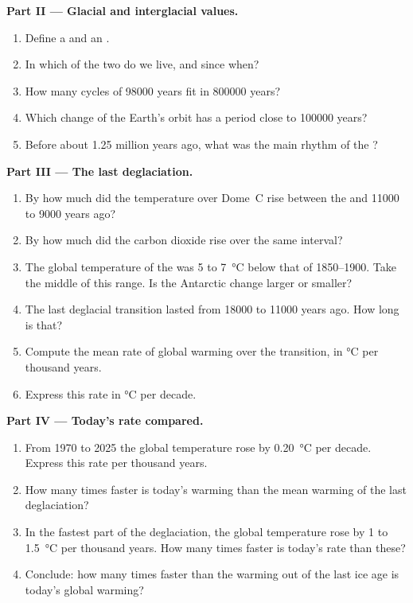 \begin{problem}
\medskip
\noindent\textbf{Part II --- Glacial and interglacial values.}
\begin{enumerate}[resume]
  \item Define a  and an .
  \item In which of the two do we live, and since when?
  \item How many cycles of \num{98000} years fit in \num{800000} years?
  \item Which change of the Earth's orbit has a period close to
        \num{100000} years?
  \item Before about 1.25 million years ago, what was the main rhythm of
        the ?
\end{enumerate}

\medskip
\noindent\textbf{Part III --- The last deglaciation.}
\begin{enumerate}[resume]
  \item By how much did the temperature over Dome~C rise between the  and \num{11000} to \num{9000} years ago?
  \item By how much did the carbon dioxide rise over the same interval?
  \item The global temperature of the  was 5 to
        \qty{7}{\degreeCelsius} below that of 1850--1900. Take the middle of
        this range. Is the Antarctic change larger or smaller?
  \item The last deglacial transition lasted from \num{18000} to
        \num{11000} years ago. How long is that?
  \item Compute the mean rate of global warming over the transition, in
        \unit{\degreeCelsius} per thousand years.
  \item Express this rate in \unit{\degreeCelsius} per decade.
\end{enumerate}

\medskip
\noindent\textbf{Part IV --- Today's rate compared.}
\begin{enumerate}[resume]
  \item From 1970 to 2025 the global temperature rose by
        \qty{0.20}{\degreeCelsius} per decade. Express this rate per
        thousand years.
  \item How many times faster is today's warming than the mean warming of
        the last deglaciation?
  \item In the fastest part of the deglaciation, the global temperature rose
        by 1 to \qty{1.5}{\degreeCelsius} per thousand years. How many times
        faster is today's rate than these?
  \item Conclude: how many times faster than the warming out of the last ice
        age is today's global warming?
\end{enumerate}
\end{problem}
